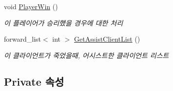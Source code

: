 \begin{DoxyCompactItemize}
void \hyperlink{class_room_client_aab61bfaebafc8159336c3ec72aa21758}{Player\+Win} ()
\begin{DoxyCompactList}\small\item\em 이 플레이어가 승리했을 경우에 대한 처리 \end{DoxyCompactList}\item 
forward\+\_\+list$<$ int $>$ \hyperlink{class_room_client_a77d6732bdd92fd7222949f8408a1a4d4}{Get\+Assist\+Client\+List} ()
\begin{DoxyCompactList}\small\item\em 이 클라이언트가 죽었을때, 어시스트한 클라이언트 리스트 \end{DoxyCompactList}\end{DoxyCompactItemize}
\subsection*{Private 속성}
